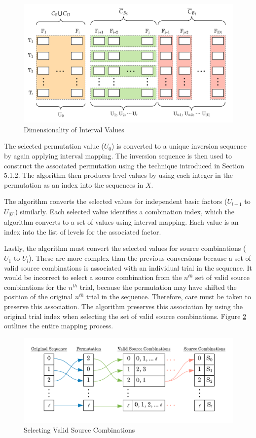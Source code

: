 \begin{figure}[t]
\centering
\centerline{\includegraphics[origin=c,width=12cm]{../figures/sequence-dimensions.png}}
\caption{Dimensionality of Interval Values}
\label{fig:sequence_dimensions}
\end{figure}

The selected permutation value ($U_0$) is converted to a unique inversion sequence by again applying interval mapping. The inversion sequence is then used to construct the associated permutation using the technique introduced in Section 5.1.2. The algorithm then produces level values by using each integer in the permutation as an index into the sequences in $X$.

The algorithm converts the selected values for independent basic factors ($U_{l+1}$ to $U_{|U|}$) similarly. Each selected value identifies a combination index, which the algorithm converts to a set of values using interval mapping. Each value is an index into the list of levels for the associated factor. %

Lastly, the algorithm must convert the selected values for source combinations ($U_1$ to $U_l$). These are more complex than the previous conversions because a set of valid source combinations is associated with an individual trial in the sequence. It would be incorrect to select a source combination from the $n^{th}$ set of valid source combinations for the $n^{th}$ trial, because the permutation may have shifted the position of the original $n^{th}$ trial in the sequence. Therefore, care must be taken to preserve this association. The algorithm preserves this association by using the original trial index when selecting the set of valid source combinations. Figure \ref{fig:source_combinations} outlines the entire mapping process.


\begin{figure}[t]
\centering
\centerline{\includegraphics[origin=c,width=12cm]{../figures/source-combination-mapping.png}}
\caption{Selecting Valid Source Combinations}
\label{fig:source_combinations}
\end{figure}

